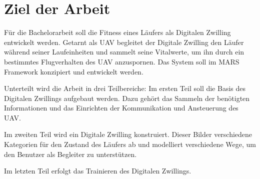 \section{Ziel der Arbeit}

Für die Bachelorarbeit soll die Fitness eines Läufers als Digitalen Zwilling entwickelt werden. Getarnt als UAV begleitet der Digitale Zwilling den Läufer während seiner Laufeinheiten und sammelt seine Vitalwerte, um ihn durch ein bestimmtes Flugverhalten des UAV anzuspornen. Das System soll im MARS Framework konzipiert und entwickelt werden. 

Unterteilt wird die Arbeit in drei Teilbereiche:
Im ersten Teil soll die Basis des Digitalen Zwillings aufgebaut werden. Dazu gehört das Sammeln der benötigten Informationen und das Einrichten der Kommunikation und Ansteuerung des UAV.

Im zweiten Teil wird ein Digitale Zwilling konstruiert. Dieser Bilder verschiedene Kategorien für den Zustand des Läufers ab und modelliert verschiedene Wege, um den Benutzer als Begleiter zu unterstützen. 

Im letzten Teil erfolgt das Trainieren des Digitalen Zwillings.
